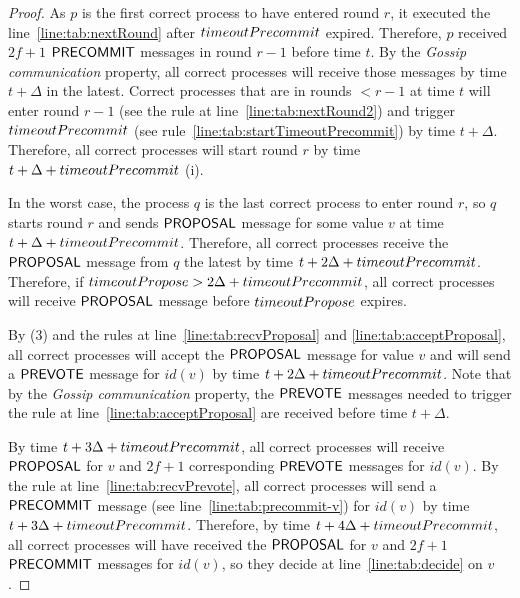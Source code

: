 \begin{proof}
As $p$ is the first correct process to have entered round $r$, it executed the line~\ref{line:tab:nextRound} after $timeoutPrecommit$ expired. Therefore, $p$ received $2f+1$ $\mathsf{PRECOMMIT}$ messages in round $r-1$ before time $t$. By the \emph{Gossip communication} property, all correct processes will receive those messages by time $t + \Delta$ in the latest. Correct processes that
are in rounds $< r-1$ at time $t$ will enter round $r-1$ (see the rule at line~\ref{line:tab:nextRound2}) and trigger $timeoutPrecommit$ (see rule~\ref{line:tab:startTimeoutPrecommit})
by time $t+\Delta$. Therefore, all correct processes will start round $r$ by time $t+\Delta+timeoutPrecommit$ (i).
 
In the worst case, the process $q$ is the last correct process to enter round $r$, so $q$ starts round $r$ and sends $\mathsf{PROPOSAL}$ message for some value $v$ at time $t + \Delta + timeoutPrecommit$. Therefore, all correct processes receive the $\mathsf{PROPOSAL}$ message from $q$ the latest by time $t + 2\Delta + timeoutPrecommit$. Therefore, if $timeoutPropose > 2\Delta + timeoutPrecommit$, 
all correct processes will receive $\mathsf{PROPOSAL}$ message before $timeoutPropose$ expires. 

By (3) and the rules at line~\ref{line:tab:recvProposal} and \ref{line:tab:acceptProposal}, all correct processes will accept the $\mathsf{PROPOSAL}$ message for value $v$ and will send a $\mathsf{PREVOTE}$ message for $id(v)$ by time $t + 2\Delta + timeoutPrecommit$. 
Note that by the \emph{Gossip communication} property, the $\mathsf{PREVOTE}$ messages needed to trigger the rule at line~\ref{line:tab:acceptProposal} are received before time $t + \Delta$.  

By time $t + 3\Delta + timeoutPrecommit$, all correct processes will receive $\mathsf{PROPOSAL}$ for $v$ and $2f+1$ corresponding $\mathsf{PREVOTE}$ messages for $id(v)$. By the rule at line~\ref{line:tab:recvPrevote}, all correct processes will send a $\mathsf{PRECOMMIT}$ message (see line~\ref{line:tab:precommit-v}) for $id(v)$ by time $t + 3\Delta + timeoutPrecommit$. Therefore, by time $t + 4\Delta + timeoutPrecommit$, all correct processes will have received the $\mathsf{PROPOSAL}$ for $v$ and $2f+1$ $\mathsf{PRECOMMIT}$ messages for $id(v)$, so they decide at line~\ref{line:tab:decide} on $v$. 


\end{proof}
